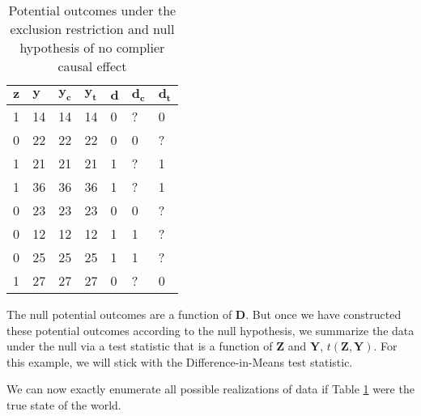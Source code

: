 \documentclass[12pt,leqno]{article}
\theoremstyle{newstyle}
\begin{document}
\begin{table}[H]
\centering
    \begin{tabular}{l|l|l|l|l|l|l}
    $\mathbf{z}$ & $\mathbf{y}$ & $\mathbf{y_c}$ & $\mathbf{y_t}$ & $\mathbf{d}$ & $\mathbf{d_c}$ & $\mathbf{d_t}$ \\ \hline
    1 & 14 & 14 & 14 & 0 & ? & 0 \\
    0 & 22 & 22 & 22 & 0 & 0 & ? \\
    1 & 21 & 21 & 21 & 1 & ? & 1 \\
    1 & 36 & 36 & 36 & 1 & ? & 1 \\
    0 & 23 & 23 & 23 & 0 & 0 & ? \\
    0 & 12 & 12 & 12 & 1 & 1 & ? \\
    0 & 25 & 25 & 25 & 1 & 1 & ? \\
    1 & 27 & 27  & 27 & 0 & ? & 0\\
    \end{tabular}
    \caption{Potential outcomes under the exclusion restriction and null hypothesis of no complier causal effect}
    \label{tab: pot outs under null}
\end{table}

The null potential outcomes are a function of \(\mathbf{D}\). But once
we have constructed these potential outcomes according to the null
hypothesis, we summarize the data under the null via a test statistic
that is a function of \(\mathbf{Z}\) and \(\mathbf{Y}\),
\(t\left(\mathbf{Z}, \mathbf{Y}\right)\). For this example, we will
stick with the Difference-in-Means test statistic.

We can now exactly enumerate all possible realizations of data if Table
\ref{tab: pot outs under null} were the true state of the world.
\end{document}

